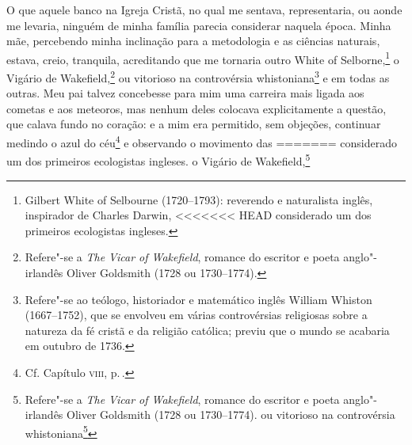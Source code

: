 {{{{{{{{{{{{{{{{{{{{{{{{{{{{{{{{{{{{{{{{{{{{{{{{{{{{{{{{{{{{{{{{{{{{{{{{{{{{{{{{O que aquele banco na Igreja Cristã, no qual me sentava, representaria,
ou aonde me levaria, ninguém de minha família parecia considerar naquela
época. Minha mãe, percebendo minha inclinação para a metodologia e as
ciências naturais, estava, creio, tranquila, acreditando que me tornaria
outro White of Selborne,\footnote{Gilbert White of Selbourne (1720--1793):
  reverendo e naturalista inglês, inspirador de Charles Darwin,
<<<<<<< HEAD
  considerado um dos primeiros ecologistas ingleses.} o
Vigário de Wakefield,\footnote{Refere"-se a \textit{The Vicar of Wakefield},
  romance do escritor e poeta anglo"-irlandês Oliver Goldsmith (1728 ou
  1730--1774).} ou vitorioso na controvérsia
whistoniana\footnote{Refere"-se ao teólogo, historiador e matemático
  inglês William Whiston (1667--1752), que se envolveu em várias
  controvérsias religiosas sobre a natureza da fé cristã e da religião
  católica; previu que o mundo se acabaria em outubro de 1736.} e em todas as outras. Meu pai talvez concebesse para mim uma
carreira mais ligada aos cometas e aos meteoros, mas nenhum deles
colocava explicitamente a questão, que calava fundo no coração: e a mim
era permitido, sem objeções, continuar medindo o azul do céu\footnote{Cf.
  Capítulo \textsc{viii}, p.\,\pageref{176}.} e observando o movimento das
=======
  considerado um dos primeiros ecologistas ingleses.  o
Vigário de Wakefield,\footnote{Refere"-se a \textit{The Vicar of Wakefield},
  romance do escritor e poeta anglo"-irlandês Oliver Goldsmith (1728 ou
  1730--1774).  ou vitorioso na controvérsia
whistoniana\footnote{Refere"-se ao teólogo, historiador e matemático
  inglês William Whiston (1667--1752), que se envolveu em várias
  controvérsias religiosas sobre a natureza da fé cristã e da religião
  católica; previu que o mundo se acabaria em outubro de 1736.  e em todas as outras. Meu pai talvez concebesse para mim uma
carreira mais ligada aos cometas e aos meteoros, mas nenhum deles
colocava explicitamente a questão, que calava fundo no coração: e a mim
era permitido, sem objeções, continuar medindo o azul do céu\footnote{Cf.
  Capítulo \textsc{viii}, p.\,\pageref{176}.  e observando o movimento das
>>>>>>> 7ef31cc2a6d5603f856fee4c85bc83700040648c
nuvens, até que tivesse esquecido todo o latim que sabia, além de todo o
grego, exceto a ode de Anacreonte sobre a rosa.

}}}}}}}}}}}}}}}}}}}}}}}}}}}}}}}}}}}}}}}}}}}}}}}}}}}}}}}}}}}}}}}}}}}}}}}}}}}}}}}}}}}
